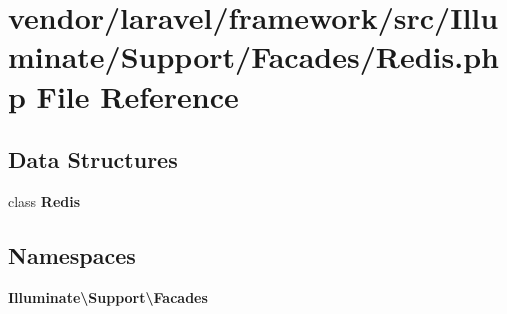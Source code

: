 \section{vendor/laravel/framework/src/\+Illuminate/\+Support/\+Facades/\+Redis.php File Reference}
\label{_redis_8php}
\subsection*{Data Structures}
\begin{DoxyCompactItemize}
\item 
class {\bf Redis}
\end{DoxyCompactItemize}
\subsection*{Namespaces}
\begin{DoxyCompactItemize}
\item 
 {\bf Illuminate\textbackslash{}\+Support\textbackslash{}\+Facades}
\end{DoxyCompactItemize}
